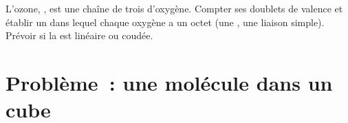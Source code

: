 \begin{exercise}[$\star\star\star$]\label{exo:g10:lewis-and-shape:15}
L'ozone, , est une chaîne de trois  d'oxygène. Compter ses
doublets de valence et établir un  dans lequel chaque
oxygène a un octet (une , une liaison simple). Prévoir si
la  est linéaire ou coudée.
\end{exercise}

\section{Problème~: une molécule dans un cube}

